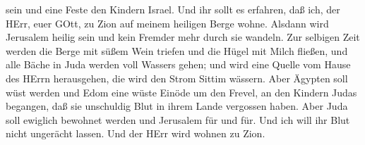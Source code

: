 sein und eine Feste den Kindern Israel.  Und ihr sollt es
erfahren, daß ich, der HErr, euer GOtt, zu Zion auf meinem heiligen
Berge wohne. Alsdann wird Jerusalem heilig sein und kein Fremder mehr
durch sie wandeln.  Zur selbigen Zeit werden die Berge mit
süßem Wein triefen und die Hügel mit Milch fließen, und alle Bäche in
Juda werden voll Wassers gehen; und wird eine Quelle vom Hause des HErrn
herausgehen, die wird den Strom Sittim wässern.  Aber
Ägypten soll wüst werden und Edom eine wüste Einöde um den Frevel, an
den Kindern Judas begangen, daß sie unschuldig Blut in ihrem Lande
vergossen haben.  Aber Juda soll ewiglich bewohnet werden
und Jerusalem für und für.  Und ich will ihr Blut nicht
ungerächt lassen. Und der HErr wird wohnen zu Zion.
